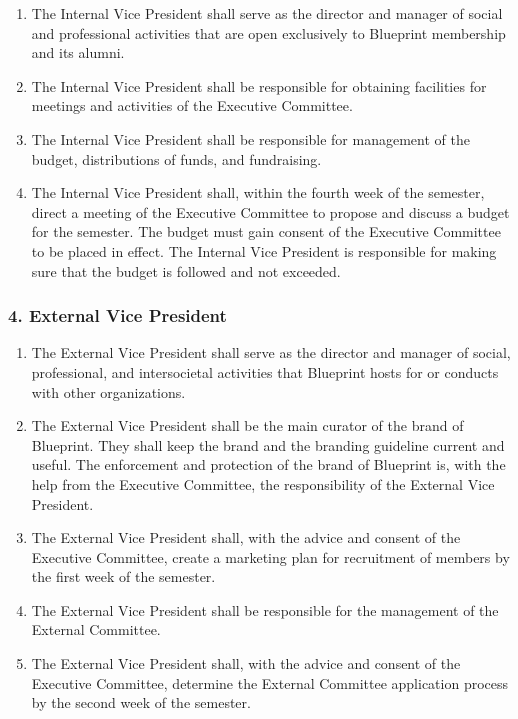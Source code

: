 \documentclass[
]{article}
\providecommand{\tightlist}{%
  \setlength{\itemsep}{0pt}\setlength{\parskip}{0pt}}
\begin{document}
\begin{enumerate}
\def\labelenumi{\arabic{enumi}.}
\tightlist
\item
  The Internal Vice President shall serve as the director and manager of
  social and professional activities that are open exclusively to
  Blueprint membership and its alumni.
\item
  The Internal Vice President shall be responsible for obtaining
  facilities for meetings and activities of the Executive Committee.
\item
  The Internal Vice President shall be responsible for management of the
  budget, distributions of funds, and fundraising.
\item
  The Internal Vice President shall, within the fourth week of the
  semester, direct a meeting of the Executive Committee to propose and
  discuss a budget for the semester. The budget must gain consent of the
  Executive Committee to be placed in effect. The Internal Vice
  President is responsible for making sure that the budget is followed
  and not exceeded.
\end{enumerate}

\hypertarget{external-vice-president}{%
\subsubsection{4. External Vice
President}\label{external-vice-president}}

\begin{enumerate}
\def\labelenumi{\arabic{enumi}.}
\tightlist
\item
  The External Vice President shall serve as the director and manager of
  social, professional, and intersocietal activities that Blueprint
  hosts for or conducts with other organizations.
\item
  The External Vice President shall be the main curator of the brand of
  Blueprint. They shall keep the brand and the branding guideline
  current and useful. The enforcement and protection of the brand of
  Blueprint is, with the help from the Executive Committee, the
  responsibility of the External Vice President.
\item
  The External Vice President shall, with the advice and consent of the
  Executive Committee, create a marketing plan for recruitment of
  members by the first week of the semester.
\item
  The External Vice President shall be responsible for the management of
  the External Committee.
\item
  The External Vice President shall, with the advice and consent of the
  Executive Committee, determine the External Committee application
  process by the second week of the semester.
\end{enumerate}
\end{document}
